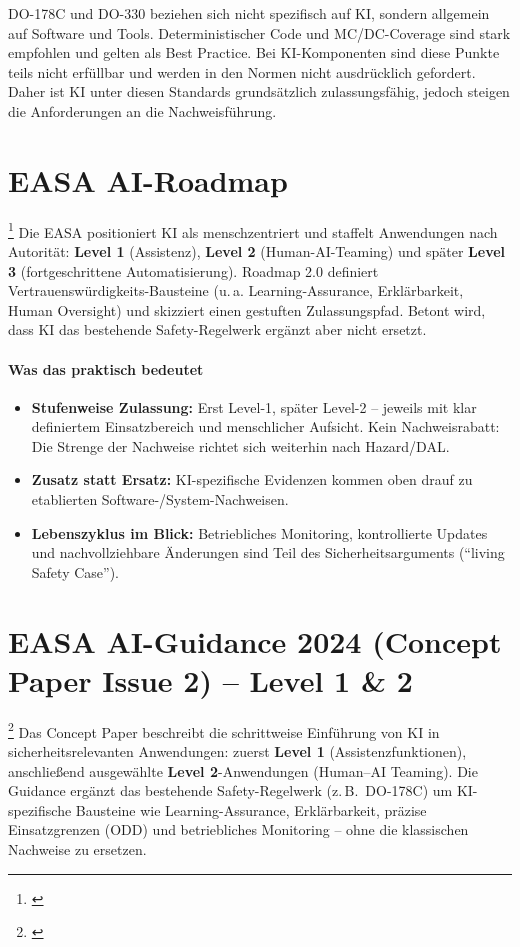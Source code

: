 DO-178C und DO-330 beziehen sich nicht spezifisch auf KI, sondern allgemein auf Software und Tools. Deterministischer Code 
und MC/DC-Coverage sind stark empfohlen und gelten als Best Practice. Bei KI-Komponenten sind diese Punkte teils nicht erfüllbar 
und werden in den Normen nicht ausdrücklich gefordert. Daher ist KI unter diesen Standards grundsätzlich zulassungsfähig, jedoch 
steigen die Anforderungen an die Nachweisführung.






\section{EASA AI-Roadmap }\footnote{ \parencite{easa-ai-roadmap-2-2023}}
Die EASA positioniert KI als menschzentriert und staffelt Anwendungen nach Autorität: \textbf{Level 1} (Assistenz), 
\textbf{Level 2} (Human-AI-Teaming) und später \textbf{Level 3} (fortgeschrittene Automatisierung). 
Roadmap 2.0 definiert Vertrauenswürdigkeits-Bausteine (u.\,a. Learning-Assurance, Erklärbarkeit, Human Oversight) 
und skizziert einen gestuften Zulassungspfad. Betont wird, dass KI das bestehende Safety-Regelwerk ergänzt aber nicht ersetzt.
\paragraph{Was das praktisch bedeutet}
\begin{itemize}
  \item \textbf{Stufenweise Zulassung:} Erst Level-1, später Level-2 – jeweils mit klar definiertem Einsatzbereich und menschlicher Aufsicht. Kein Nachweisrabatt: Die Strenge der Nachweise richtet sich weiterhin nach Hazard/DAL.
  \item \textbf{Zusatz statt Ersatz:} KI-spezifische Evidenzen kommen oben drauf zu etablierten Software-/System-Nachweisen.
  \item \textbf{Lebenszyklus im Blick:} Betriebliches Monitoring, kontrollierte Updates und nachvollziehbare Änderungen sind Teil des Sicherheitsarguments (``living Safety Case'').
\end{itemize}



\section{EASA AI-Guidance 2024 (Concept Paper Issue 2) – Level 1 \& 2} \footnote{ \parencite{easa-ai-concept-issue2-2024}} \label{sec:concept_paper}
Das Concept Paper beschreibt die schrittweise Einführung von KI in sicherheitsrelevanten Anwendungen: 
zuerst \textbf{Level 1} (Assistenzfunktionen), anschließend ausgewählte \textbf{Level 2}-Anwendungen (Human–AI Teaming). 
Die Guidance ergänzt das bestehende Safety-Regelwerk (z.\,B.\ DO-178C) um KI-spezifische Bausteine wie Learning-Assurance, 
Erklärbarkeit, präzise Einsatzgrenzen (ODD) und betriebliches Monitoring – ohne die klassischen Nachweise zu ersetzen.

